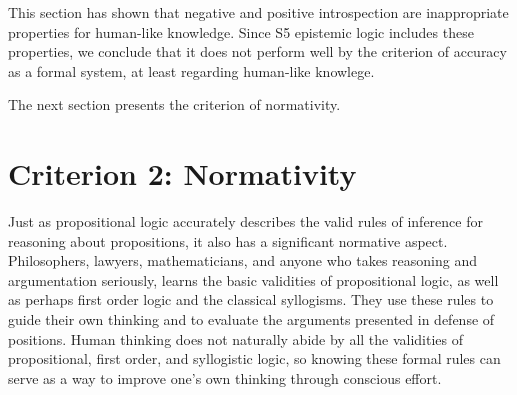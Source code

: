 %
This section has shown that negative and positive introspection are inappropriate properties for human-like knowledge. Since S5 epistemic logic includes these properties, we conclude that it does not perform well by the criterion of accuracy as a formal system, at least regarding human-like knowlege.

The next section presents the criterion of normativity.
\section{Criterion 2: Normativity}
\label{sec:normativity}
Just as propositional logic accurately describes the valid rules of inference for reasoning about propositions, it also has a significant normative aspect. Philosophers, lawyers, mathematicians, and anyone who takes reasoning and argumentation seriously, learns the basic validities of propositional logic, as well as perhaps first order logic and the classical syllogisms. They use these rules to guide their own thinking and to evaluate the arguments presented in defense of positions. Human thinking does not naturally abide by all the validities of propositional, first order, and syllogistic logic, so knowing these formal rules can serve as a way to improve one's own thinking through conscious effort.


